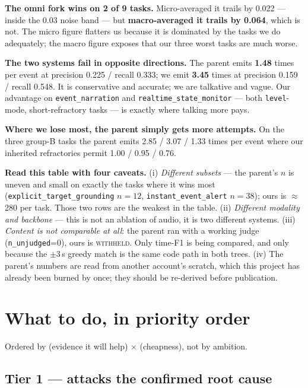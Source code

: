\documentclass[11pt,a4paper]{article}
\newenvironment{keybox}{\begin{shaded}\noindent}{\end{shaded}}
\begin{document}
\noindent\textbf{The omni fork wins on 2 of 9 tasks.} Micro-averaged it trails by 0.022 ---
inside the 0.03 noise band --- but \textbf{macro-averaged it trails by 0.064}, which is not.
The micro figure flatters us because it is dominated by the tasks we do adequately; the
macro figure exposes that our three worst tasks are much worse.

\vspace{4pt}
\noindent\textbf{The two systems fail in opposite directions.} The parent emits
\textbf{1.48} times per event at precision 0.225 / recall 0.333; we emit \textbf{3.45} times
at precision 0.159 / recall 0.548. It is conservative and accurate; we are talkative and
vague. Our advantage on \texttt{event\_narration} and \texttt{realtime\_state\_monitor} --- both
\texttt{level}-mode, short-refractory tasks --- is exactly where talking more pays.

\vspace{4pt}
\noindent\textbf{Where we lose most, the parent simply gets more attempts.} On the three
group-B tasks the parent emits 2.85 / 3.07 / 1.33 times per event where our inherited
refractories permit 1.00 / 0.95 / 0.76.

\begin{keybox}
\textbf{Read this table with four caveats.} (i) \emph{Different subsets} --- the parent's
$n$ is uneven and small on exactly the tasks where it wins most
(\texttt{explicit\_target\_grounding} $n{=}12$, \texttt{instant\_event\_alert} $n{=}38$); ours is
$\approx$280 per task. Those two rows are the weakest in the table. (ii) \emph{Different
modality and backbone} --- this is not an ablation of audio, it is two different systems.
(iii) \emph{Content is not comparable at all}: the parent ran with a working judge
(\texttt{n\_unjudged}=0), ours is \textsc{withheld}. Only time-F1 is being compared, and only
because the $\pm$3\,s greedy match is the same code path in both trees. (iv) The parent's
numbers are read from another account's scratch, which this project has already been burned
by once; they should be re-derived before publication.
\end{keybox}

\section{What to do, in priority order}

Ordered by (evidence it will help) $\times$ (cheapness), not by ambition.

\subsection*{Tier 1 --- attacks the confirmed root cause}
\end{document}
